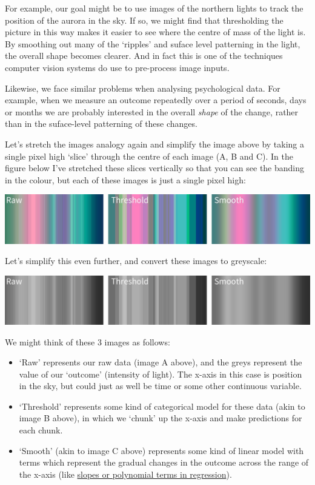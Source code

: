 \documentclass[]{article}
\begin{document}
For example, our goal might be to use images of the northern lights to track the
position of the aurora in the sky. If so, we might find that thresholding the
picture in this way makes it easier to see where the centre of mass of the light
is. By smoothing out many of the `ripples' and suface level patterning in the
light, the overall shape becomes clearer. And in fact this is one of the
techniques computer vision systems do use to pre-process image inputs.

Likewise, we face similar problems when analysing psychological data. For
example, when we measure an outcome repeatedly over a period of seconds, days or
months we are probably interested in the overall \emph{shape} of the change, rather
than in the suface-level patterning of these changes.

Let's stretch the images analogy again and simplify the image above by taking a
single pixel high `slice' through the centre of each image (A, B and C). In the
figure below I've stretched these slices vertically so that you can see the
banding in the colour, but each of these images is just a single pixel high:

\includegraphics{media/aurora-1-px.jpg}

Let's simplify this even further, and convert these images to greyscale:

\includegraphics{media/aurora-1-px-grey.jpg}

We might think of these 3 images as follows:

\begin{itemize}
\item
  `Raw' represents our raw data (image A above), and the greys represent the
  value of our `outcome' (intensity of light). The x-axis in this case is
  position in the sky, but could just as well be time or some other continuous
  variable.
\item
  `Threshold' represents some kind of categorical model for these data (akin
  to image B above), in which we `chunk' up the x-axis and make predictions
  for each chunk.
\item
  `Smooth' (akin to image C above) represents some kind of linear model with
  terms which represent the gradual changes in the outcome across the range of
  the x-axis (like \protect\hyperlink{polynomials}{slopes or polynomial terms in regression}).
\end{itemize}
\end{document}
